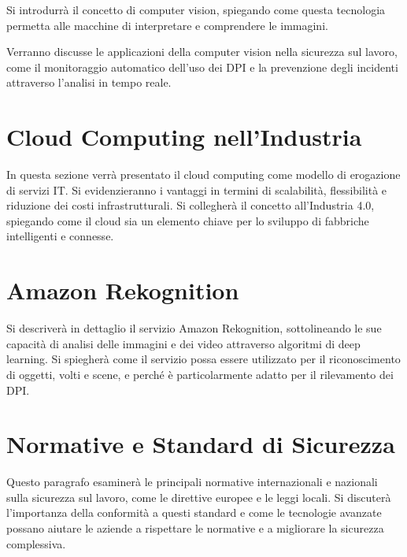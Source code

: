Si introdurrà il concetto di computer vision, spiegando come questa tecnologia permetta alle macchine di interpretare e comprendere le immagini. 



Verranno discusse le applicazioni della computer vision nella sicurezza sul lavoro, come il monitoraggio automatico dell'uso dei DPI e la prevenzione degli incidenti attraverso l'analisi in tempo reale.

\section{Cloud Computing nell'Industria}

In questa sezione verrà presentato il cloud computing come modello di erogazione di servizi IT. Si evidenzieranno i vantaggi in termini di scalabilità, flessibilità e riduzione dei costi infrastrutturali. Si collegherà il concetto all'Industria 4.0, spiegando come il cloud sia un elemento chiave per lo sviluppo di fabbriche intelligenti e connesse.

\section{Amazon Rekognition}

Si descriverà in dettaglio il servizio Amazon Rekognition, sottolineando le sue capacità di analisi delle immagini e dei video attraverso algoritmi di deep learning. Si spiegherà come il servizio possa essere utilizzato per il riconoscimento di oggetti, volti e scene, e perché è particolarmente adatto per il rilevamento dei DPI.

\section{Normative e Standard di Sicurezza}

Questo paragrafo esaminerà le principali normative internazionali e nazionali sulla sicurezza sul lavoro, come le direttive europee e le leggi locali. Si discuterà l'importanza della conformità a questi standard e come le tecnologie avanzate possano aiutare le aziende a rispettare le normative e a migliorare la sicurezza complessiva.
